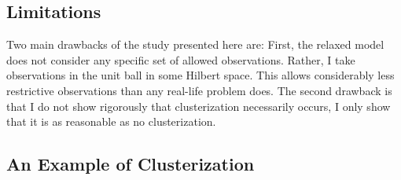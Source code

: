 \subsection{Limitations}\label{subsec:limitations}
Two main drawbacks of the study presented here are: First, the relaxed
model does not consider any specific set of allowed
observations. Rather, I take observations in the unit ball in some
Hilbert space. This allows considerably less restrictive observations
than any real-life problem does. The second drawback is that I do not
show rigorously that clusterization necessarily occurs, I only show
that it is as reasonable as no clusterization.


\subsection{An Example of Clusterization}\label{subsec:example}
